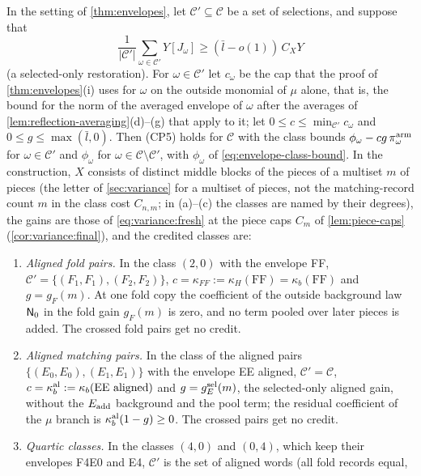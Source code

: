 \begin{lemma}\label{lem:class-credit}
In the setting of \cref{thm:envelopes}, let $\mathcal C'\subseteq\mathcal C$ be a set of
selections, and suppose that
\[
 \frac1{|\mathcal C'|}\sum_{\omega\in\mathcal C'}Y[J_\omega]\ge(\bar l-o(1))\,C_XY
\]
(a selected-only restoration). For $\omega\in\mathcal C'$ let $c_\omega$ be the cap that the
proof of \cref{thm:envelopes}(i) uses for $\omega$ on the outside monomial of $\mu$ alone,
that is, the bound for the norm of the averaged envelope of $\omega$ after the averages of
\cref{lem:reflection-averaging}(d)--(g) that apply to it; let $0\le c\le\min_{\mathcal
C'}c_\omega$ and $0\le g\le\max(\bar l,0)$. Then (CP5) holds for $\mathcal C$ with the class bounds
$\phi_\omega-cg\,\pi^{\rm arm}_\omega$ for $\omega\in\mathcal C'$ and $\phi_\omega$ for
$\omega\in\mathcal C\setminus\mathcal C'$, with $\phi_\omega$ of \eqref{eq:envelope-class-bound}. In the
construction, $X$ consists of distinct middle blocks of the pieces of a multiset
$m$ of pieces (the letter of \cref{sec:variance} for a multiset of pieces, not the matching-record count $m$ in the class cost $C_{n,m}$; in (a)--(c) the classes are named
by their degrees), the gains are those of \eqref{eq:variance:fresh} at the piece caps $C_m$
of \cref{lem:piece-caps} (\cref{cor:variance:final}), and the credited classes are:
\begin{enumerate}[label=(\alph*)]
\item \emph{Aligned fold pairs.} In the class $(2,0)$ with the envelope FF,
 $\mathcal C'=\{(F_1,F_1),(F_2,F_2)\}$, $c=\kappa_{FF}:=\kappa_H(\mathrm{FF})=\kappa_b(\mathrm{FF})$ and
 $g=g_F(m)$. At one fold copy the coefficient of the outside
 background law $\mathsf N_0$ in the fold gain $g_F(m)$ is zero, and no
 term pooled over later pieces is added. The crossed fold pairs get no credit.
\item \emph{Aligned matching pairs.} In the class of the aligned pairs
 $\{(E_0,E_0),(E_1,E_1)\}$ with the envelope EE aligned, $\mathcal C'=\mathcal C$,
 $c=\kappa^{\rm al}_b:=\kappa_b(\text{EE aligned})$ and $g=g^{\rm sel}_E(m)$, the selected-only
 aligned gain, without the $E_{\rm add}$ background and the pool term; the residual
 coefficient of the $\mu$ branch is $\kappa^{\rm al}_b(1-g)\ge0$. The crossed pairs get no
 credit.
\item \emph{Quartic classes.} In the classes $(4,0)$ and $(0,4)$, which keep their
 envelopes F4E0 and E4, $\mathcal C'$ is the set of aligned words (all fold records equal,

\end{enumerate}
\end{lemma}
